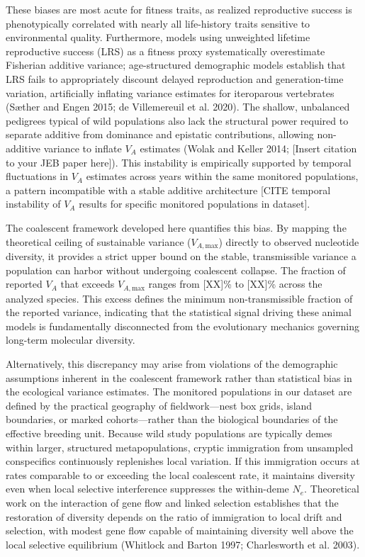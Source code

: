 \documentclass[12pt]{article}
\begin{document}
These biases are most acute for fitness traits, as realized reproductive success is phenotypically correlated with nearly all life-history traits sensitive to environmental quality. Furthermore, models using unweighted lifetime reproductive success (LRS) as a fitness proxy systematically overestimate Fisherian additive variance; age-structured demographic models establish that LRS fails to appropriately discount delayed reproduction and generation-time variation, artificially inflating variance estimates for iteroparous vertebrates (Sæther and Engen 2015; de Villemereuil et al. 2020). The shallow, unbalanced pedigrees typical of wild populations also lack the structural power required to separate additive from dominance and epistatic contributions, allowing non-additive variance to inflate $V_A$ estimates (Wolak and Keller 2014; [Insert citation to your JEB paper here]). This instability is empirically supported by temporal fluctuations in $V_A$ estimates across years within the same monitored populations, a pattern incompatible with a stable additive architecture [CITE temporal instability of $V_A$ results for specific monitored populations in dataset].

The coalescent framework developed here quantifies this bias. By mapping the theoretical ceiling of sustainable variance ($V_{A,\text{max}}$) directly to observed nucleotide diversity, it provides a strict upper bound on the stable, transmissible variance a population can harbor without undergoing coalescent collapse. The fraction of reported $V_A$ that exceeds $V_{A,\text{max}}$ ranges from [XX]\% to [XX]\% across the analyzed species. This excess defines the minimum non-transmissible fraction of the reported variance, indicating that the statistical signal driving these animal models is fundamentally disconnected from the evolutionary mechanics governing long-term molecular diversity.

Alternatively, this discrepancy may arise from violations of the demographic assumptions inherent in the coalescent framework rather than statistical bias in the ecological variance estimates. The monitored populations in our dataset are defined by the practical geography of fieldwork—nest box grids, island boundaries, or marked cohorts—rather than the biological boundaries of the effective breeding unit. Because wild study populations are typically demes within larger, structured metapopulations, cryptic immigration from unsampled conspecifics continuously replenishes local variation. If this immigration occurs at rates comparable to or exceeding the local coalescent rate, it maintains diversity even when local selective interference suppresses the within-deme $N_e$. Theoretical work on the interaction of gene flow and linked selection establishes that the restoration of diversity depends on the ratio of immigration to local drift and selection, with modest gene flow capable of maintaining diversity well above the local selective equilibrium (Whitlock and Barton 1997; Charlesworth et al. 2003).
\end{document}
